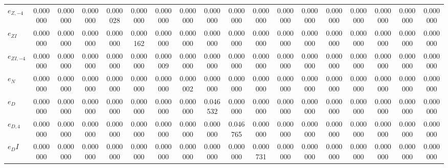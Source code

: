 \begin{center}
\begin{longtable}{lccccccccccccccccc}
${e_{Z,-4}}    $	 & 	        0.000000	 & 	        0.000000	 & 	        0.000000	 & 	        0.000028	 & 	        0.000000	 & 	        0.000000	 & 	        0.000000	 & 	        0.000000	 & 	        0.000000	 & 	        0.000000	 & 	        0.000000	 & 	        0.000000	 & 	        0.000000	 & 	        0.000000	 & 	        0.000000	 & 	        0.000000	 & 	        0.000000 \\ 
${e_{ZI}}      $	 & 	        0.000000	 & 	        0.000000	 & 	        0.000000	 & 	        0.000000	 & 	        0.000162	 & 	        0.000000	 & 	        0.000000	 & 	        0.000000	 & 	        0.000000	 & 	        0.000000	 & 	        0.000000	 & 	        0.000000	 & 	        0.000000	 & 	        0.000000	 & 	        0.000000	 & 	        0.000000	 & 	        0.000000 \\ 
${e_{ZI,-4}}   $	 & 	        0.000000	 & 	        0.000000	 & 	        0.000000	 & 	        0.000000	 & 	        0.000000	 & 	        0.000009	 & 	        0.000000	 & 	        0.000000	 & 	        0.000000	 & 	        0.000000	 & 	        0.000000	 & 	        0.000000	 & 	        0.000000	 & 	        0.000000	 & 	        0.000000	 & 	        0.000000	 & 	        0.000000 \\ 
${e_N}         $	 & 	        0.000000	 & 	        0.000000	 & 	        0.000000	 & 	        0.000000	 & 	        0.000000	 & 	        0.000000	 & 	        0.000002	 & 	        0.000000	 & 	        0.000000	 & 	        0.000000	 & 	        0.000000	 & 	        0.000000	 & 	        0.000000	 & 	        0.000000	 & 	        0.000000	 & 	        0.000000	 & 	        0.000000 \\ 
${e_D}         $	 & 	        0.000000	 & 	        0.000000	 & 	        0.000000	 & 	        0.000000	 & 	        0.000000	 & 	        0.000000	 & 	        0.000000	 & 	        0.046532	 & 	        0.000000	 & 	        0.000000	 & 	        0.000000	 & 	        0.000000	 & 	        0.000000	 & 	        0.000000	 & 	        0.000000	 & 	        0.000000	 & 	        0.000000 \\ 
${e_{D,4}}     $	 & 	        0.000000	 & 	        0.000000	 & 	        0.000000	 & 	        0.000000	 & 	        0.000000	 & 	        0.000000	 & 	        0.000000	 & 	        0.000000	 & 	        0.046765	 & 	        0.000000	 & 	        0.000000	 & 	        0.000000	 & 	        0.000000	 & 	        0.000000	 & 	        0.000000	 & 	        0.000000	 & 	        0.000000 \\ 
${e_DI}        $	 & 	        0.000000	 & 	        0.000000	 & 	        0.000000	 & 	        0.000000	 & 	        0.000000	 & 	        0.000000	 & 	        0.000000	 & 	        0.000000	 & 	        0.000000	 & 	        0.000731	 & 	        0.000000	 & 	        0.000000	 & 	        0.000000	 & 	        0.000000	 & 	        0.000000	 & 	        0.000000	 & 	        0.000000 \\ 

\end{longtable}
\end{center}
